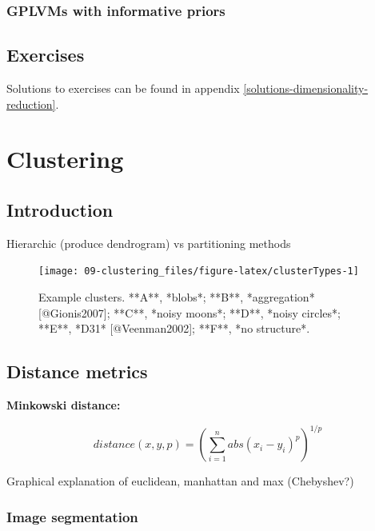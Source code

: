 \documentclass[]{book}
\theoremstyle{definition}
\theoremstyle{definition}
\theoremstyle{definition}
\theoremstyle{remark}
\begin{document}
\subsection{GPLVMs with informative
priors}\label{gplvms-with-informative-priors}

\section{Exercises}\label{exercises-6}

Solutions to exercises can be found in appendix
\ref{solutions-dimensionality-reduction}.

\chapter{Clustering}\label{clustering}

\section{Introduction}\label{introduction}

Hierarchic (produce dendrogram) vs partitioning methods

\begin{figure}

{\centering \texttt{[image: 09-clustering\_files/figure-latex/clusterTypes-1]} 

}

\caption{Example clusters. **A**, *blobs*; **B**, *aggregation* [@Gionis2007]; **C**, *noisy moons*; **D**, *noisy circles*; **E**, *D31* [@Veenman2002]; **F**, *no structure*.}\label{fig:clusterTypes}
\end{figure}

\section{Distance metrics}\label{distance-metrics}

\textbf{Minkowski distance:}

\begin{equation}
  distance\left(x,y,p\right)=\left(\sum_{i=1}^{n} abs(x_i-y_i)^p\right)^{1/p}
  \label{eq:minkowski}
\end{equation}

Graphical explanation of euclidean, manhattan and max (Chebyshev?)

\subsection{Image segmentation}\label{image-segmentation}
\end{document}
